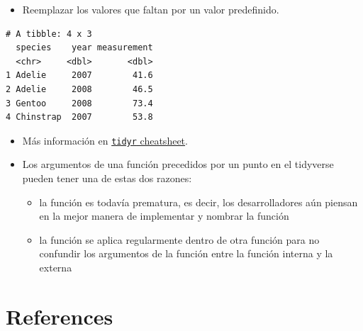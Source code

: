 \documentclass[
  letterpaper,
  DIV=11,
  numbers=noendperiod]{scrreprt}
\newenvironment{Shaded}{\begin{snugshade}}{\end{snugshade}}
\newcommand{\AttributeTok}[1]{\textcolor[rgb]{0.40,0.45,0.13}{#1}}
\newcommand{\FunctionTok}[1]{\textcolor[rgb]{0.28,0.35,0.67}{#1}}
\newcommand{\NormalTok}[1]{\textcolor[rgb]{0.00,0.23,0.31}{#1}}
\newcommand{\SpecialCharTok}[1]{\textcolor[rgb]{0.37,0.37,0.37}{#1}}
\providecommand{\tightlist}{%
  \setlength{\itemsep}{0pt}\setlength{\parskip}{0pt}}\usepackage{longtable,booktabs,array}
\newlength{\cslhangindent}
\newlength{\cslentryspacingunit} %
\newenvironment{CSLReferences}[2] %
 {%
  \setlength{\parindent}{0pt}
  \ifodd #1
  \let\oldpar\par
  \def\par{\hangindent=\cslhangindent\oldpar}
  \fi
  \setlength{\parskip}{#2\cslentryspacingunit}
 }%
 {}
\begin{document}
\begin{itemize}
\tightlist
\item
  Reemplazar los valores que faltan por un valor predefinido.
\end{itemize}

\begin{Shaded}
\end{Shaded}

\begin{verbatim}
# A tibble: 4 x 3
  species    year measurement
  <chr>     <dbl>       <dbl>
1 Adelie     2007        41.6
2 Adelie     2008        46.5
3 Gentoo     2008        73.4
4 Chinstrap  2007        53.8
\end{verbatim}

\begin{itemize}
\item
  Más información en
  \href{https://raw.githubusercontent.com/rstudio/cheatsheets/master/data-import.pdf}{\texttt{tidyr}
  cheatsheet}.
\item
  Los argumentos de una función precedidos por un punto en el tidyverse
  pueden tener una de estas dos razones:

  \begin{itemize}
  \item
    la función es todavía prematura, es decir, los desarrolladores aún
    piensan en la mejor manera de implementar y nombrar la función
  \item
    la función se aplica regularmente dentro de otra función para no
    confundir los argumentos de la función entre la función interna y la
    externa
  \end{itemize}
\end{itemize}


\hypertarget{references}{%
\chapter*{References}\label{references}}


\hypertarget{refs}{}
\begin{CSLReferences}{0}{0}
\end{CSLReferences}
\end{document}
